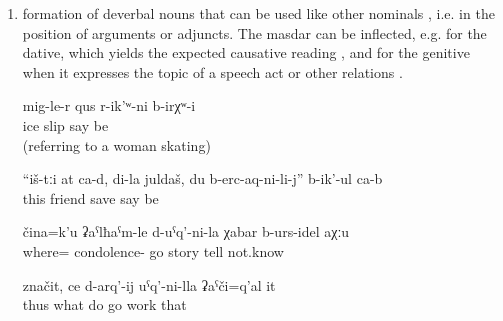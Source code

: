 \begin{enumerate}
	\item	formation of deverbal nouns that can be used like other nominals , i.e. in the position of arguments or adjuncts. The masdar can be inflected, e.g. for the dative, which yields the expected causative reading , and for the genitive when it expresses the topic of a speech act  or other relations .
	\begin{exe}
		\ex	\label{ex:‎‎‎There was skating on the ice. (referring to a woman skating)}
		\gll	mig-le-r	qus	r-ik'ʷ-ni	b-irχʷ-i\\
			ice	slip	say	be\\
		\glt	{} (referring to a woman skating)

		\ex	\label{ex:‎‎‎These (gems) are for you, my friend, because you saved me, said the bear}
		\gll	``iš-tːi	at	ca-d,	di-la	juldaš,		du	b-erc-aq-ni-li-j''	b-ik'-ul	ca-b\\
			this				friend			\tsc{n-}save		say	be\\
		\glt	{}

		\ex	\label{ex:‎‎‎I don't know if I should tell you the story about how we went somewhere}
		\gll	čina=k'u	ʡaˁlħaˁm-le	d-uˁq'-ni-la		χabar	b-urs-idel	aχːu\\
			where=	condolence-	go	story	tell	not.know\\
		\glt	{}

		\ex	\label{ex:What to do, this pasturing (lit. the work of going after the animals) is work}
		\gll	značit,	ce	d-arq'-ij	uˁq'-ni-lla	ʡaˁči=q'al	it\\
			thus	what	do	go	work	that\\
		\glt	{}
	\end{exe}	
\end{enumerate}


